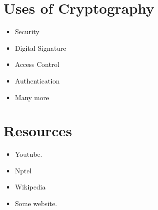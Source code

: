 \documentclass[12pt,a4paper]{report}
\begin{document}
\section*{Uses of Cryptography}
\begin{itemize}
\item Security
\item Digital Signature
\item Access Control
\item Authentication
\item Many more
\end{itemize}
\section*{Resources}
\begin{itemize}
\item Youtube.
\item Nptel
\item Wikipedia 
\item Some website.
\end{itemize}

\endgroup
\end{document}
